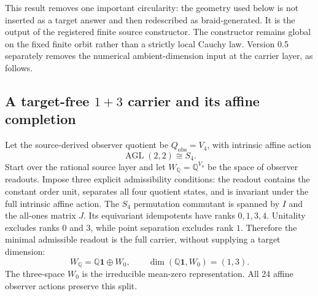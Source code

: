 \documentclass[11pt]{article}
\theoremstyle{definition}
\theoremstyle{remark}
\newcommand{\id}{\mathbf{1}}
\begin{document}
This result removes one important circularity: the geometry used below is not inserted as a target answer and then redescribed as braid-generated. It is the output of the registered finite source constructor. The constructor remains global on the fixed finite orbit rather than a strictly local Cauchy law. Version 0.5 separately removes the numerical ambient-dimension input at the carrier layer, as follows.

\subsection{A target-free $1+3$ carrier and its affine completion}

Let the source-derived observer quotient be $Q_{\mathrm{obs}}=V_4$, with intrinsic affine action
\[
 \operatorname{AGL}(2,2)\cong S_4.
\]
Start over the rational source layer and let $W_{\mathbb Q}=\mathbb Q^{V_4}$ be the space of observer readouts. Impose three explicit admissibility conditions: the readout contains the constant order unit, separates all four quotient states, and is invariant under the full intrinsic affine action. The $S_4$ permutation commutant is spanned by $I$ and the all-ones matrix $J$. Its equivariant idempotents have ranks $0,1,3,4$. Unitality excludes ranks $0$ and $3$, while point separation excludes rank $1$. Therefore the minimal admissible readout is the full carrier, without supplying a target dimension:
\begin{equation}\label{eq:source13}
 W_{\mathbb Q}=\mathbb Q\id\oplus W_0,
 \qquad \dim(\mathbb Q\id,W_0)=(1,3).
\end{equation}
The three-space $W_0$ is the irreducible mean-zero representation. All 24 affine observer actions preserve this split.
\end{document}
